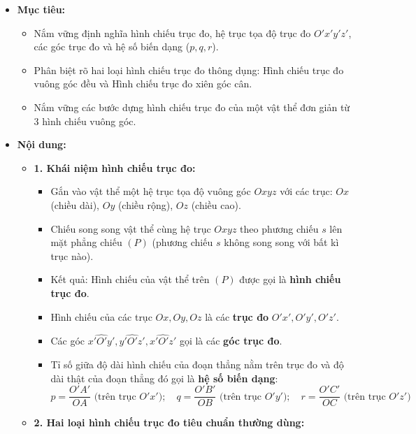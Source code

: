 \documentclass[12pt, a4paper]{article}
\begin{document}
\begin{itemize}[leftmargin=1.2cm]
    \item[a)] \textbf{Mục tiêu:}
    \begin{itemize}[leftmargin=0.6cm]
        \item Nắm vững định nghĩa hình chiếu trục đo, hệ trục tọa độ trục đo $O'x'y'z'$, các góc trục đo và hệ số biến dạng ($p, q, r$).
        \item Phân biệt rõ hai loại hình chiếu trục đo thông dụng: Hình chiếu trục đo vuông góc đều và Hình chiếu trục đo xiên góc cân.
        \item Nắm vững các bước dựng hình chiếu trục đo của một vật thể đơn giản từ 3 hình chiếu vuông góc.
    \end{itemize}

    \item[b)] \textbf{Nội dung:}
    \begin{itemize}[leftmargin=0.6cm]
        \item \textbf{1. Khái niệm hình chiếu trục đo:}
        \begin{itemize}
            \item Gắn vào vật thể một hệ trục tọa độ vuông góc $Oxyz$ với các trục: $Ox$ (chiều dài), $Oy$ (chiều rộng), $Oz$ (chiều cao).
            \item Chiếu song song vật thể cùng hệ trục $Oxyz$ theo phương chiếu $s$ lên mặt phẳng chiếu $(P)$ (phương chiếu $s$ không song song với bất kì trục nào).
            \item Kết quả: Hình chiếu của vật thể trên $(P)$ được gọi là \textbf{hình chiếu trục đo}.
            \item Hình chiếu của các trục $Ox, Oy, Oz$ là các \textbf{trục đo} $O'x', O'y', O'z'$.
            \item Các góc $\widehat{x'O'y'}, \widehat{y'O'z'}, \widehat{x'O'z'}$ gọi là các \textbf{góc trục đo}.
            \item Tỉ số giữa độ dài hình chiếu của đoạn thẳng nằm trên trục đo và độ dài thật của đoạn thẳng đó gọi là \textbf{hệ số biến dạng}:
            $$p = \frac{O'A'}{OA} \text{ (trên trục } O'x'); \quad q = \frac{O'B'}{OB} \text{ (trên trục } O'y'); \quad r = \frac{O'C'}{OC} \text{ (trên trục } O'z')$$
        \end{itemize}

        \item \textbf{2. Hai loại hình chiếu trục đo tiêu chuẩn thường dùng:}
    \end{itemize}


\end{itemize}
\end{document}
